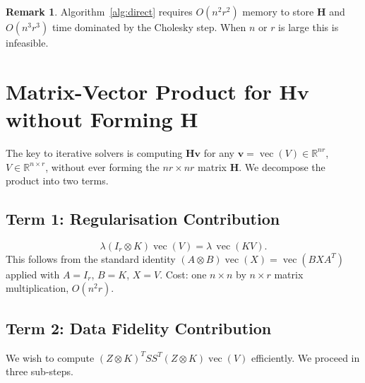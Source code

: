 \documentclass[12pt]{article}
\theoremstyle{definition}
\newtheorem{remark}[theorem]{Remark}
\DeclareMathOperator{\vecop}{vec}
\newcommand{\R}{\mathbb{R}}
\newcommand{\bH}{\mathbf{H}}
\newcommand{\bv}{\mathbf{v}}
\begin{document}
\begin{remark}
  Algorithm~\ref{alg:direct} requires $O(n^2r^2)$ memory to store $\bH$ and
  $O(n^3r^3)$ time dominated by the Cholesky step.  When $n$ or $r$ is large
  this is infeasible.
\end{remark}

\section{Matrix-Vector Product for $\bH\bv$ without Forming $\bH$}

The key to iterative solvers is computing $\bH\bv$ for any
$\bv=\vecop(V)\in\R^{nr}$, $V\in\R^{n\times r}$, without ever forming the
$nr\times nr$ matrix $\bH$.  We decompose the product into two terms.

\subsection{Term 1: Regularisation Contribution}

\begin{equation}\label{eq:term1}
  \lambda(I_r\otimes K)\vecop(V) = \lambda\,\vecop(KV).
\end{equation}
This follows from the standard identity $(A\otimes B)\vecop(X)=\vecop(BXA^T)$
applied with $A=I_r$, $B=K$, $X=V$.  Cost: one $n\times n$ by $n\times r$
matrix multiplication, $O(n^2 r)$.

\subsection{Term 2: Data Fidelity Contribution}

We wish to compute $(Z\otimes K)^TSS^T(Z\otimes K)\vecop(V)$ efficiently.
We proceed in three sub-steps.
\end{document}
